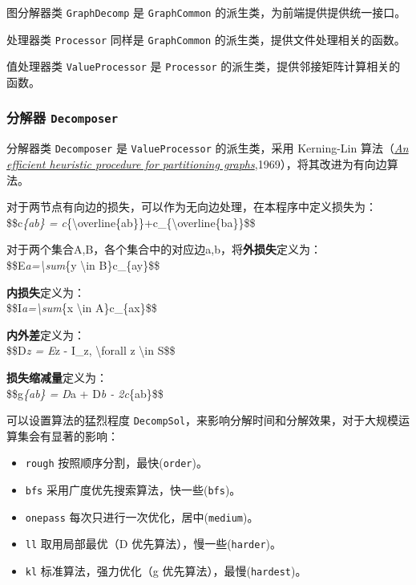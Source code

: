 \documentclass[
]{article}
\begin{document}
图分解器类 \texttt{GraphDecomp} 是 \texttt{GraphCommon}
的派生类，为前端提供提供统一接口。

处理器类 \texttt{Processor} 同样是 \texttt{GraphCommon}
的派生类，提供文件处理相关的函数。

值处理器类 \texttt{ValueProcessor} 是 \texttt{Processor}
的派生类，提供邻接矩阵计算相关的函数。

\hypertarget{header-n135}{%
\subsubsection{\texorpdfstring{分解器
\texttt{Decomposer}}{分解器 Decomposer}}\label{header-n135}}

分解器类 \texttt{Decomposer} 是 \texttt{ValueProcessor} 的派生类，采用
Kerning-Lin
算法（\href{https://ieeexplore.ieee.org/document/6771089/}{\emph{An
efficient heuristic procedure for partitioning
graphs}},1969），将其改进为有向边算法。

对于两节点有向边的损失，可以作为无向边处理，在本程序中定义损失为：\\
\$\$c\emph{\{ab\} =
c}\{\textbackslash overline\{ab\}\}+c\_\{\textbackslash overline\{ba\}\}\$\$

对于两个集合A,B，各个集合中的对应边a,b，将\textbf{外损失}定义为：\\
\$\$E\emph{a=\textbackslash sum}\{y \textbackslash in B\}c\_\{ay\}\$\$

\textbf{内损失}定义为：\\
\$\$I\emph{a=\textbackslash sum}\{x \textbackslash in A\}c\_\{ax\}\$\$

\textbf{内外差}定义为：\\
\$\$D\emph{z = E}z - I\_z, \textbackslash forall z \textbackslash in
S\$\$

\textbf{损失缩减量}定义为：\\
\$\$g\emph{\{ab\} = D}a + D\emph{b - 2c}\{ab\}\$\$

可以设置算法的猛烈程度
\texttt{DecompSol}，来影响分解时间和分解效果，对于大规模运算集会有显著的影响：

\begin{itemize}
\item
  \texttt{rough} 按照顺序分割，最快(\texttt{order})。
\item
  \texttt{bfs} 采用广度优先搜索算法，快一些(\texttt{bfs})。
\item
  \texttt{onepass} 每次只进行一次优化，居中(\texttt{medium})。
\item
  \texttt{ll} 取用局部最优（D 优先算法），慢一些(\texttt{harder})。
\item
  \texttt{kl} 标准算法，强力优化（g 优先算法），最慢(\texttt{hardest})。
\end{itemize}
\end{document}
